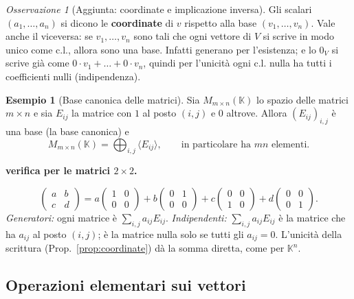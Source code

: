 \documentclass[11pt,a4paper]{article}
\newcommand{\KK}{\mathbb{K}}
\theoremstyle{plain}
\theoremstyle{definition}
\newtheorem{esempio}[prop]{Esempio}
\theoremstyle{remark}
\newtheorem{oss}[prop]{Osservazione}
\begin{document}
\begin{oss}[Aggiunta: coordinate e implicazione inversa]
Gli scalari $(a_1,\dots,a_n)$ si dicono le \textbf{coordinate} di $v$ rispetto alla base $(v_1,\dots,v_n)$.
Vale anche il viceversa: se $v_1,\dots,v_n$ sono tali che ogni vettore di $V$ si scrive in modo unico come c.l., allora sono una base.
Infatti generano per l'esistenza; e lo $0_V$ si scrive già come $0\cdot v_1+\dots+0\cdot v_n$, quindi per l'unicità ogni c.l. nulla ha tutti i coefficienti nulli (indipendenza).
\end{oss}

\begin{esempio}[Base canonica delle matrici]
Sia $M_{m\times n}(\KK)$ lo spazio delle matrici $m\times n$ e sia $E_{ij}$ la matrice con $1$ al posto $(i,j)$ e $0$ altrove. Allora $(E_{ij})_{i,j}$ è una base (la base canonica) e
\[
  M_{m\times n}(\KK)=\bigoplus_{i,j}\langle E_{ij}\rangle,\qquad \text{in particolare ha } mn \text{ elementi.}
\]
\end{esempio}

\par\medskip
\noindent\textbf{verifica per le matrici $2\times2$.}\par

\[
  \begin{pmatrix}a&b\\c&d\end{pmatrix}
  =a\begin{pmatrix}1&0\\0&0\end{pmatrix}
  +b\begin{pmatrix}0&1\\0&0\end{pmatrix}
  +c\begin{pmatrix}0&0\\1&0\end{pmatrix}
  +d\begin{pmatrix}0&0\\0&1\end{pmatrix}.
\]
\emph{Generatori:} ogni matrice è $\sum_{i,j}a_{ij}E_{ij}$.
\emph{Indipendenti:} $\sum_{i,j}a_{ij}E_{ij}$ è la matrice che ha $a_{ij}$ al posto $(i,j)$; è la matrice nulla solo se tutti gli $a_{ij}=0$.
L'unicità della scrittura (Prop.~\ref{prop:coordinate}) dà la somma diretta, come per $\KK^n$.
\par\medskip

\subsection{Operazioni elementari sui vettori}
\end{document}
